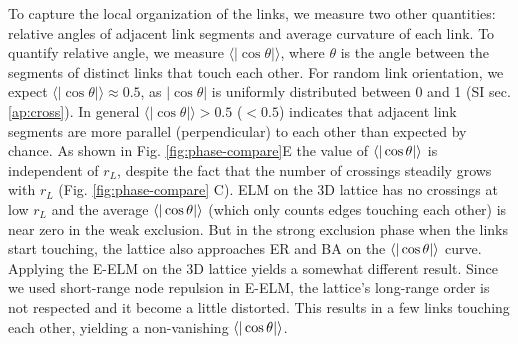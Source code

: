 \documentclass[nofootinbib,preprint,floatfix,titlepage,endfloats]{revtex4} %
\begin{document}
To capture the local organization of the links,
we measure two other quantities: relative angles of adjacent link segments and average curvature of each link. To quantify relative angle, we measure $\langle |\cos\theta |\rangle$, where $\theta$ is the angle between the segments of distinct links that touch each other. 
%
For random link orientation, we expect $\langle |\cos\theta |\rangle \approx 0.5$, as $|\cos\theta |$ is uniformly distributed between 0 and 1 (SI sec. \ref{ap:cross}). 
In general $\langle |\cos\theta |\rangle > 0.5 $ ($<0.5$) indicates that adjacent link segments are more parallel (perpendicular) to each other than expected by chance.
As shown in Fig. \ref{fig:phase-compare}E the value of $\be{|\cos\theta|}$ is independent of $r_L$, despite the fact that the number of crossings steadily grows with $r_L$ (Fig. \ref{fig:phase-compare} C).
ELM on the 3D lattice has no crossings at low $r_L$ and the average $\be{|\cos\theta|}$ (which only counts edges touching each other) is near zero in the weak exclusion. But in the strong exclusion phase when the links start touching, the lattice also approaches ER and BA on the $\be{|\cos\theta|}$ curve. 
Applying the E-ELM on the 3D lattice yields a somewhat different result. Since we used short-range node repulsion in E-ELM, the lattice's long-range order is not respected and it become a little distorted. This results in a few links touching each other, yielding a non-vanishing $\be{|\cos\theta|}$.
\end{document}
